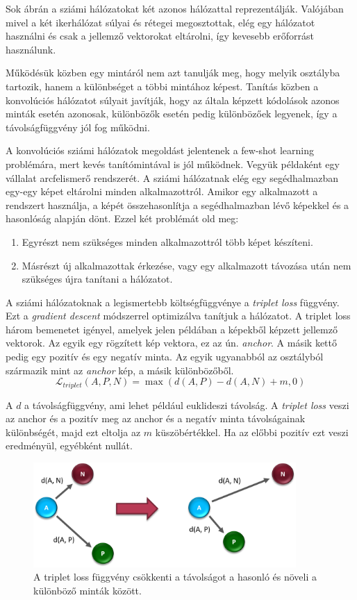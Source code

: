 Sok ábrán a sziámi hálózatokat két azonos hálózattal reprezentálják. Valójában mivel a két ikerhálózat súlyai és rétegei megosztottak, elég egy hálózatot használni és csak a jellemző vektorokat eltárolni, így kevesebb erőforrást használunk.

Működésük közben egy mintáról nem azt tanulják meg, hogy melyik osztályba tartozik, hanem a különbséget a többi mintához képest. Tanítás közben a konvolúciós hálózatot súlyait javítják, hogy az általa képzett kódolások azonos minták esetén azonosak, különbözők esetén pedig különbözőek legyenek, így a távolságfüggvény jól fog működni.

A konvolúciós sziámi hálózatok megoldást jelentenek a few-shot learning problémára, mert kevés tanítómintával is jól működnek. Vegyük példaként egy vállalat arcfelismerő rendszerét. A sziámi hálózatnak elég egy segédhalmazban egy-egy képet eltárolni minden alkalmazottról. Amikor egy alkalmazott a rendszert használja, a képét összehasonlítja a segédhalmazban lévő képekkel és a hasonlóság alapján dönt. Ezzel két problémát old meg:

\begin{enumerate}
	\item Egyrészt nem szükséges minden alkalmazottról több képet készíteni.
	\item Másrészt új alkalmazottak érkezése, vagy egy alkalmazott távozása után nem szükséges újra tanítani a hálózatot.
\end{enumerate}

A sziámi hálózatoknak a legismertebb költségfüggvénye a \emph{triplet loss} függvény. Ezt a \emph{gradient descent} módszerrel optimizálva tanítjuk a hálózatot. A triplet loss három bemenetet igényel, amelyek jelen példában a képekből képzett jellemző vektorok. Az egyik egy rögzített kép vektora, ez az ún. \emph{anchor}. A másik kettő pedig egy pozitív és egy negatív minta. Az egyik ugyanabból az osztályból származik mint az \emph{anchor} kép, a másik különbözőből.
\begin{equation}\label{eq:4}
	\mathcal{L}_{triplet}(A, P, N) = \max(d(A, P) - d(A, N) + m, 0)
\end{equation}

A $d$ a távolságfüggvény, ami lehet például euklideszi távolság. A \emph{triplet loss} veszi az anchor és a pozitív meg az anchor és a negatív minta távolságainak különbségét, majd ezt eltolja az $m$ küszöbértékkel. Ha az előbbi pozitív ezt veszi eredményül, egyébként nullát.

\begin{figure}[!ht]
	\centering
	\includegraphics[width=100mm, keepaspectratio]{figures/triplet-loss.png}
	\caption{A triplet loss függvény csökkenti a távolságot a hasonló és növeli a különböző minták között.}
	\label{fig:triplet-loss}
\end{figure}

